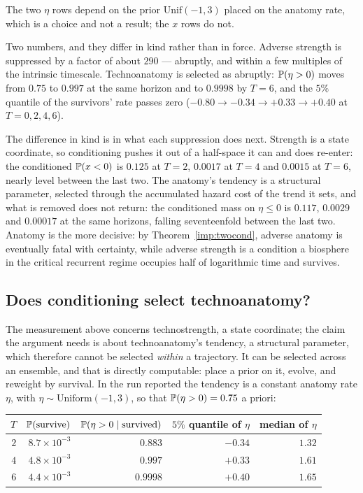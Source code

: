 \noindent The two $\eta$ rows depend on the prior $\mathrm{Unif}(-1,3)$
placed on the anatomy rate, which is a choice and not a result; the $x$
rows do not.

\begin{remark}\label{gr:rem:truncresc}
Two numbers, and they differ in kind rather than in force. Adverse
strength is suppressed by a factor of about $290$ --- abruptly, and
within a few multiples of the intrinsic timescale. Technoanatomy is
selected as abruptly: $\mathbb{P}(\eta>0)$ moves from $0.75$ to $0.997$ at the
same horizon and to $0.9998$ by $T=6$, and the $5\%$ quantile of the
survivors' rate passes zero ($-0.80\to-0.34\to+0.33\to+0.40$ at
$T=0,2,4,6$).

The difference in kind is in what each suppression does next. Strength is
a state coordinate, so conditioning pushes it out of a half-space it can
and does re-enter: the conditioned $\mathbb{P}(x<0)$ is $0.125$ at $T=2$,
$0.0017$ at $T=4$ and $0.0015$ at $T=6$, nearly level between the last
two. The anatomy's tendency is a structural parameter, selected through
the accumulated hazard cost of the trend it sets, and what is removed does
not return: the conditioned mass on $\eta\le0$ is $0.117$, $0.0029$ and
$0.00017$ at the same horizons, falling seventeenfold between the last
two. Anatomy is the more decisive:
by Theorem~\ref{imp:twocond}, adverse anatomy is eventually fatal
with certainty, while adverse strength is a condition a biosphere in the critical
recurrent regime occupies half of logarithmic time and survives.

\end{remark}

\subsection{Does conditioning select technoanatomy?}
\label{gr:subsub:anatsel}

The measurement above concerns technostrength, a state coordinate; the
claim the argument needs is about technoanatomy's tendency, a structural parameter,
which therefore cannot be selected \emph{within} a trajectory. It can be
selected across an ensemble, and that is directly computable: place a
prior on it, evolve, and reweight by survival. In the run reported the
tendency is a constant anatomy rate $\eta$, with
$\eta\sim\mathrm{Uniform}(-1,3)$, so that $\mathbb{P}(\eta>0)=0.75$ a priori:

\begin{center}\small
\begin{tabular}{@{}rrrrr@{}}
\toprule
$T$ & $\mathbb{P}(\text{survive})$ & $\mathbb{P}(\eta>0\mid\text{survived})$ &
$5\%$ quantile of $\eta$ & median of $\eta$\\
\midrule
$2$ & $8.7\times10^{-3}$ & $0.883$ & $-0.34$ & $1.32$\\
$4$ & $4.8\times10^{-3}$ & $0.997$ & $+0.33$ & $1.61$\\
$6$ & $4.4\times10^{-3}$ & $0.9998$ & $+0.40$ & $1.65$\\
\bottomrule
\end{tabular}
\end{center}

